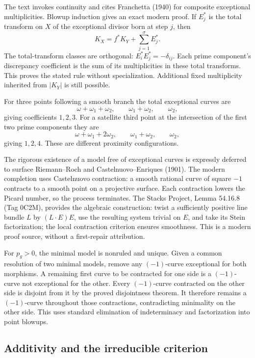 The text invokes continuity and cites Franchetta (1940) for composite exceptional multiplicities. Blowup induction gives an exact modern proof. If \(E_j^*\) is the total transform on \(X\) of the exceptional divisor born at step \(j\), then \[
K_X=f^*K_Y+\sum_{j=1}^{\sigma}E_j^*.
\] The total-transform classes are orthogonal: \(E_i^*E_j^*=-\delta_{ij}\). Each prime component's discrepancy coefficient is the sum of its multiplicities in these total transforms. This proves the stated rule without specialization. Additional fixed multiplicity inherited from \(|K_Y|\) is still possible.

For three points following a smooth branch the total exceptional curves are \[
\omega+\omega_1+\omega_2,\qquad\omega_1+\omega_2,\qquad\omega_2,
\] giving coefficients \(1,2,3\). For a satellite third point at the intersection of the first two prime components they are \[
\omega+\omega_1+2\omega_2,\qquad\omega_1+\omega_2,\qquad\omega_2,
\] giving \(1,2,4\). These are different proximity configurations.

The rigorous existence of a model free of exceptional curves is expressly deferred to surface Riemann--Roch and Castelnuovo--Enriques (1901). The modern completion uses Castelnuovo contraction: a smooth rational curve of square \(-1\) contracts to a smooth point on a projective surface. Each contraction lowers the Picard number, so the process terminates. The Stacks Project, Lemma 54.16.8 (Tag 0C2M), provides the algebraic construction: twist a sufficiently positive line bundle \(L\) by \((L\cdot E)E\), use the resulting system trivial on \(E\), and take its Stein factorization; the local contraction criterion ensures smoothness. This is a modern proof source, without a first-repair attribution.

For \(p_g>0\), the minimal model is nonruled and unique. Given a common resolution of two minimal models, remove any \((-1)\)-curve exceptional for both morphisms. A remaining first curve to be contracted for one side is a \((-1)\)-curve not exceptional for the other. Every \((-1)\)-curve contracted on the other side is disjoint from it by the proved disjointness theorem. It therefore remains a \((-1)\)-curve throughout those contractions, contradicting minimality on the other side. This uses standard elimination of indeterminacy and factorization into point blowups.

\subsection{Additivity and the irreducible criterion}

